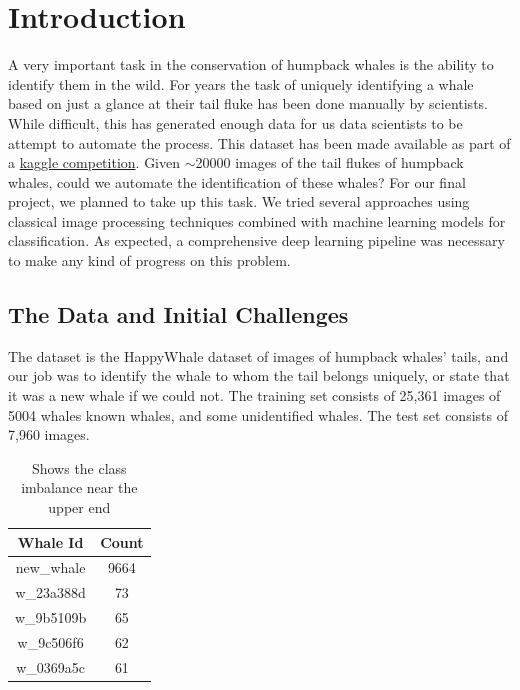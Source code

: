 \section{Introduction}
A very important task in the conservation of humpback whales is the ability to identify them in the wild. For years the task of uniquely identifying a whale based on just a glance at their tail fluke has been done manually by scientists. While difficult, this has generated enough data for us data scientists to be attempt to automate the process. This dataset has been made available as part of a \href{https://www.kaggle.com/c/humpback-whale-identification}{kaggle competition}. Given $\sim$20000 images of the tail flukes of humpback whales, could we automate the identification of these whales? For our final project, we planned to take up this task. We tried several approaches using classical image processing techniques combined with machine learning models for classification. As expected, a comprehensive deep learning pipeline was necessary to make any kind of progress on this problem.

\subsection{The Data and Initial Challenges}\label{subs:datachallenges}

The dataset is the HappyWhale dataset of images of humpback whales' tails, and our job was to identify the whale to whom the tail belongs uniquely, or state that it was a new whale if we could not. The training set consists of 25,361 images of 5004 whales known whales, and some unidentified whales. The test set consists of 7,960 images.\\

\begin{table}[h!]
	\centering
	\begin{tabular}{|c|c|}\hline
		\textbf{Whale Id} & \textbf{Count}\\ \hline
		new\_whale  & 9664\\ \hline
		w\_23a388d  & 73\\ \hline
		w\_9b5109b  & 65\\ \hline
		w\_9c506f6  & 62\\ \hline
		w\_0369a5c  & 61\\ \hline
	\end{tabular}
	\caption{\label{tab:counts}Shows the class imbalance near the upper end}
\end{table}

